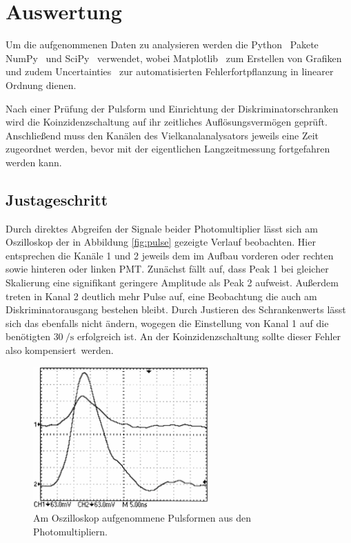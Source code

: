 \newpage
\section{Auswertung}

Um die aufgenommenen Daten zu analysieren werden die Python~\cite{python} Pakete NumPy~\cite{numpy} und SciPy~\cite{scipy} verwendet,
wobei Matplotlib~\cite{matplotlib} zum Erstellen von Grafiken und zudem Uncertainties~\cite{uncertainties} zur automatisierten
Fehlerfortpflanzung in linearer Ordnung dienen.

Nach einer Prüfung der Pulsform und Einrichtung der Diskriminatorschranken wird die Koinzidenzschaltung auf ihr zeitliches
Auflösungsvermögen geprüft. Anschließend muss den Kanälen des Vielkanalanalysators jeweils eine Zeit zugeordnet werden,
bevor mit der eigentlichen Langzeitmessung fortgefahren werden kann.



\subsection{Justageschritt}

Durch direktes Abgreifen der Signale beider Photomultiplier lässt sich am Oszilloskop der in Abbildung \eqref{fig:pulse} gezeigte
Verlauf beobachten. Hier entsprechen die Kanäle 1 und 2 jeweils dem im Aufbau vorderen oder rechten sowie hinteren oder linken
PMT. Zunächst fällt auf, dass Peak 1 bei gleicher Skalierung eine signifikant geringere Amplitude als Peak 2
aufweist. Außerdem treten in Kanal 2 deutlich mehr Pulse auf, eine Beobachtung die auch am Diskriminatorausgang bestehen bleibt.
Durch Justieren des Schrankenwerts lässt sich das ebenfalls nicht ändern, wogegen die Einstellung von Kanal 1 auf die benötigten
$\qty{30}{\per\second}$ erfolgreich ist. An der Koinzidenzschaltung sollte dieser Fehler also kompensiert~werden.

\begin{figure}[H]
	\vspace{\baselineskip}
	\centering
	\includegraphics[width=0.6\textwidth]{content/messung/pulse.jpg}
	\caption{Am Oszilloskop aufgenommene Pulsformen aus den Photomultipliern.}
	\label{fig:pulse}
\end{figure}

